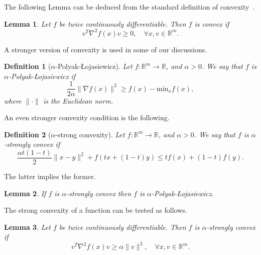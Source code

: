 \documentclass[
    aps,
    prx,
    onecolumn
]{revtex4-2}
\newtheorem{definition}{Definition}
\newtheorem{lemma}{Lemma}
\begin{document}
The following Lemma can be deduced from the standard definition of convexity~\cite{Garrigos2023}. 

\begin{lemma}
\label{lem:convexity}
Let $f$ be twice continuously differentiable. Then $f$ is convex if 
\begin{equation}
\label{eq:convex} 
    v^T \nabla^2 f(x) v \geq 0, \quad \forall x,v \in \mathbb{R}^m . 
\end{equation}
\end{lemma} 

A stronger version of convexity is used in some of our discussions.

\begin{definition}[$\alpha$-Polyak-{\L}ojasiewicz]
\label{def:PL}
Let $f : \mathbb{R}^m \rightarrow \mathbb{R}$, and $\alpha > 0$. We say that $f$ is $\alpha$-Polyak-{\L}ojasiewicz if 
\begin{equation}
\frac{1}{2\alpha}\|\nabla f(x)\|^2 \geq f(x) - \mathrm{min}_x f(x),
\end{equation} 
where $\| \cdot \|$ is the Euclidean norm.
\end{definition}

An even stronger convexity condition is the following.

\begin{definition}[$\alpha$-strong convexity]
Let $f : \mathbb{R}^m \rightarrow \mathbb{R}$, and $\alpha > 0$. We say that $f$ is $\alpha$-strongly convex if
\begin{equation}
    \frac{ \alpha t(1-t) } {2} \| x - y \| ^2 
+ f(tx + (1-t)y) \leq tf (x) + (1-t)f(y).
\end{equation} 
\end{definition}

The latter implies the former.

\begin{lemma}
\label{lem:PL}
If $f$ is $\alpha$-strongly convex then $f$ is $\alpha$-Polyak-{\L}ojasiewicz.
\end{lemma}

The strong convexity of a function can be tested as follows.

\begin{lemma}
\label{lem:strong_convexity}
Let $f$ be twice continuously differentiable. Then $f$ is $\alpha$-strongly convex if 
\begin{equation}
    v^T \nabla^2 f(x) v \geq \alpha \| v \|^2, \quad \forall x,v \in \mathbb{R}^m .
\end{equation}
\end{lemma}
\end{document}
